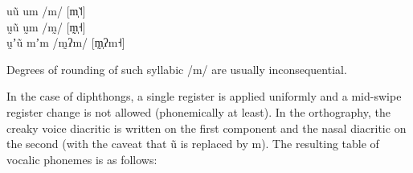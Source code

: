 \documentclass[11pt,a5paper]{book}
\newcommand{\qcn}[1]{\textcolor{AccentText}{\large#1}}
\begin{document}
\begin{center}
	\qcn{*uũ} \textrightarrow \qcn{um} \textrightarrow /m/ [m̩˥˦] \\
	\qcn{*ṵũ} \textrightarrow \qcn{ṵm} \textrightarrow /m̰/ [m̩̰˧]\\
	\qcn{*ṵʼũ} \textrightarrow \qcn{mʼm} \textrightarrow /m̰ʔm/ [m̩̰ʔm˧]\\
\end{center}

Degrees of rounding of such syllabic /m/ are usually inconsequential.

 In the case of diphthongs, a single register is applied uniformly and a mid-swipe register change is not allowed (phonemically at least). In the orthography, the creaky voice diacritic is written on the first component and the nasal diacritic on the second (with the caveat that \qcn{*ũ} is replaced by \qcn{m}). The resulting table of vocalic phonemes is as follows:
%
\end{document}
